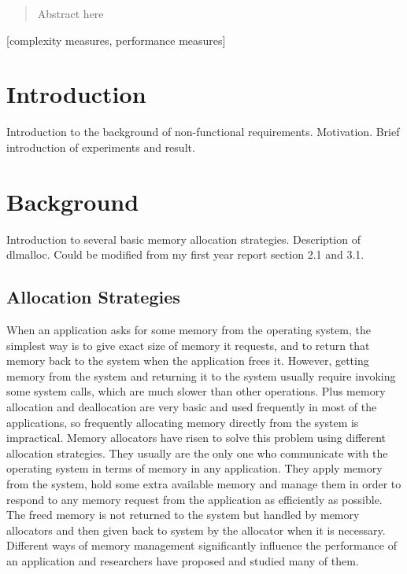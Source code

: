 \documentclass{acm_proc_article-sp}
\begin{document}
\maketitle
\begin{abstract}
Abstract here
\end{abstract}

[complexity measures, performance measures]



\section{Introduction}
Introduction to the background of non-functional requirements. Motivation. Brief introduction of experiments and result.

\section{Background}
Introduction to several basic memory allocation strategies. Description of dlmalloc. Could be modified from my first year report section 2.1 and 3.1.
\subsection{Allocation Strategies}
\label{sec_allocationstrategies}
When an application asks for some memory from the operating system, the simplest way is to give exact size of memory it requests, and to return that memory back to the system when the application frees it. However, getting memory from the system and returning it to the system usually require invoking some system calls, which are much slower than other operations. Plus memory allocation and deallocation are very basic and used frequently in most of the applications, so frequently allocating memory directly from the system is impractical. Memory allocators have risen to solve this problem using different allocation strategies. They usually are the only one who communicate with the operating system in terms of memory in any application. They apply memory from the system, hold some extra available memory and manage them in order to respond to any memory request from the application as efficiently as possible. The freed memory is not returned to the system but handled by memory allocators and then given back to system by the allocator when it is necessary. Different ways of memory management significantly influence the performance of an application and researchers have proposed and studied many of them.
\end{document}
